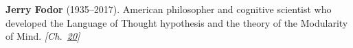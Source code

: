\textbf{Jerry Fodor} (1935–2017). American philosopher and cognitive scientist who developed the Language of Thought hypothesis and the theory of the Modularity of Mind. \emph{[Ch.~\hyperref[ch:chineseroomargument]{20}]}

